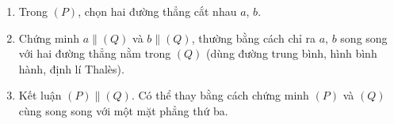 \begin{enumerate}
\item Trong $(P)$, chọn hai đường thẳng cắt nhau $a$, $b$.
\item Chứng minh $a\parallel(Q)$ và $b\parallel(Q)$, thường bằng cách chỉ ra $a$, $b$ song song với hai đường thẳng nằm trong $(Q)$ (dùng đường trung bình, hình bình hành, định lí Thalès).
\item Kết luận $(P)\parallel(Q)$. Có thể thay bằng cách chứng minh $(P)$ và $(Q)$ cùng song song với một mặt phẳng thứ ba.
\end{enumerate}

